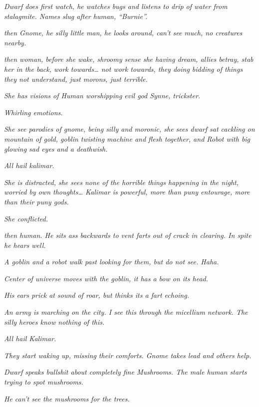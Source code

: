 \textit{Dwarf does first watch, he watches bugs and listens to drip of water from stalagmite. Names slug after human, “Burnie”.}\medskip

\textit{then Gnome, he silly little man, he looks around, can’t see much, no creatures nearby.}\medskip

\textit{then woman, before she wake, shroomy sense she having dream, allies betray, stab her in the back, work towards… not work towards, they doing bidding of things they not understand, just morons, just terrible.}\medskip

\textit{She has visions of Human worshipping evil god Synne, trickster.}\medskip

\textit{Whirling emotions.}\medskip

\textit{She see parodies of gnome, being silly and moronic, she sees dwarf sat cackling on mountain of gold, goblin twisting machine and flesh together, and Robot with big glowing sad eyes and a deathwish.}\medskip

\textit{All hail kalimar.}\medskip

\textit{She is distracted, she sees none of the horrible things happening in the night, worried by own thoughts… Kalimar is powerful, more than puny entourage, more than their puny gods.}\medskip

\textit{She conflicted.}\medskip

\textit{then human. He sits ass backwards to vent farts out of crack in clearing. In spite he hears well.}\medskip

\textit{A goblin and a robot walk past looking for them, but do not see. Haha.}\medskip

\textit{Center of universe moves with the goblin, it has a bow on its head.}\medskip

\textit{His ears prick at sound of roar, but thinks its a fart echoing.}\medskip

\textit{An army is marching on the city. I see this through the micellium network. The silly heroes know nothing of this.}\medskip

\textit{All hail Kalimar.}\medskip

\textit{They start waking up, missing their comforts. Gnome takes lead and others help.}\medskip

\textit{Dwarf speaks bullshit about completely fine Mushrooms. The male human starts trying to spot mushrooms.}\medskip

\textit{He can’t see the mushrooms for the trees.}\medskip

